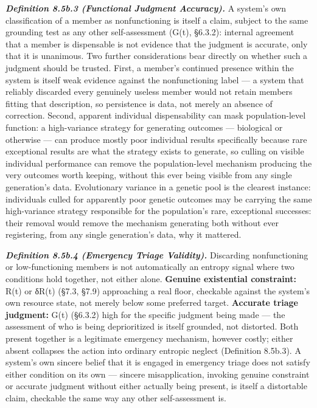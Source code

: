 \documentclass[
]{article}
\begin{document}
\emph{\textbf{Definition 8.5b.3 (Functional Judgment Accuracy).}} A
system's own classification of a member as nonfunctioning is itself a
claim, subject to the same grounding test as any other self-assessment
(G(t), §6.3.2): internal agreement that a member is dispensable is not
evidence that the judgment is accurate, only that it is unanimous. Two
further considerations bear directly on whether such a judgment should
be trusted. First, a member's continued presence within the system is
itself weak evidence against the nonfunctioning label --- a system that
reliably discarded every genuinely useless member would not retain
members fitting that description, so persistence is data, not merely an
absence of correction. Second, apparent individual dispensability can
mask population-level function: a high-variance strategy for generating
outcomes --- biological or otherwise --- can produce mostly poor
individual results specifically because rare exceptional results are
what the strategy exists to generate, so culling on visible individual
performance can remove the population-level mechanism producing the very
outcomes worth keeping, without this ever being visible from any single
generation's data. Evolutionary variance in a genetic pool is the
clearest instance: individuals culled for apparently poor genetic
outcomes may be carrying the same high-variance strategy responsible for
the population's rare, exceptional successes: their removal would remove
the mechanism generating both without ever registering, from any single
generation's data, why it mattered.

\emph{\textbf{Definition 8.5b.4 (Emergency Triage Validity).}}
Discarding nonfunctioning or low-functioning members is not
automatically an entropy signal where two conditions hold together, not
either alone. \textbf{Genuine existential constraint:} R(t) or δR(t)
(§7.3, §7.9) approaching a real floor, checkable against the system's
own resource state, not merely below some preferred target.
\textbf{Accurate triage judgment:} G(t) (§6.3.2) high for the specific
judgment being made --- the assessment of who is being deprioritized is
itself grounded, not distorted. Both present together is a legitimate
emergency mechanism, however costly; either absent collapses the action
into ordinary entropic neglect (Definition 8.5b.3). A system's own
sincere belief that it is engaged in emergency triage does not satisfy
either condition on its own --- sincere misapplication, invoking genuine
constraint or accurate judgment without either actually being present,
is itself a distortable claim, checkable the same way any other
self-assessment is.
\end{document}
